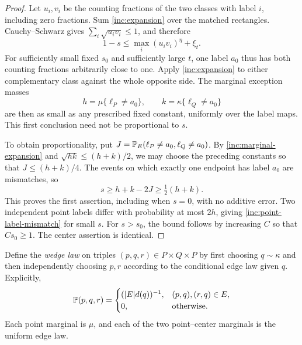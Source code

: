 \begin{proof}
Let \(u_i,v_i\) be the counting fractions of the two classes with label
\(i\), including zero fractions. Sum \eqref{inc:expansion} over the
matched rectangles. Cauchy--Schwarz gives
\(\sum_i\sqrt{u_iv_i}\le1\), and therefore
\[
 1-s\le\max_i(u_iv_i)^\eta+\xi_t.
\]
For sufficiently small fixed \(s_0\) and sufficiently large \(t\),
one label \(a_0\) thus has both counting fractions arbitrarily close
to one. Apply \eqref{inc:expansion} to either complementary class
against the whole opposite side. The marginal exception masses
\[
 h=\mu\{\ell_P\ne a_0\},\qquad
 k=\kappa\{\ell_Q\ne a_0\}
\]
are then as small as any prescribed fixed constant, uniformly over
the label maps. This first conclusion need not be proportional to \(s\).

To obtain proportionality, put
\(J=\mathbb P_E(\ell_P\ne a_0,\ell_Q\ne a_0)\).
By \eqref{inc:marginal-expansion} and \(\sqrt{hk}\le(h+k)/2\),
we may choose the preceding constants so that
\(J\le(h+k)/4\). The events on which exactly one endpoint has label
\(a_0\) are mismatches, so
\[
 s\ge h+k-2J\ge\tfrac12(h+k).
\]
This proves the first assertion, including when \(s=0\), with no
additive error. Two independent point labels differ with probability
at most \(2h\), giving \eqref{inc:point-label-mismatch} for small
\(s\). For \(s>s_0\), the bound follows by increasing \(C\) so
that \(Cs_0\ge1\). The center assertion is identical.
\end{proof}

Define the \emph{wedge law} on triples \((p,q,r)\in P\times Q\times P\)
by first choosing \(q\sim\kappa\) and then independently choosing
\(p,r\) according to the conditional edge law given \(q\). Explicitly,
\begin{equation}\label{inc:wedge-law}
 \mathbb P(p,q,r)=
 \begin{cases}
 (|E|d(q))^{-1},&(p,q),(r,q)\in E,\\
 0,&\text{otherwise}.
 \end{cases}
\end{equation}
Each point marginal is \(\mu\), and each of the two point--center
marginals is the uniform edge law.

